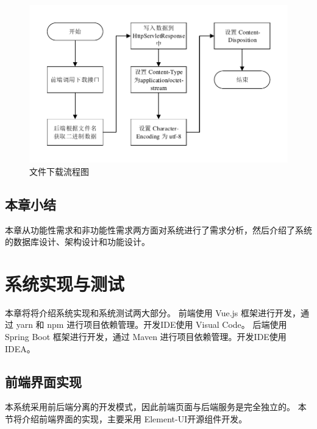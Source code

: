 \begin{figure}[ht]
    \centering
    \includegraphics[width=.8\linewidth]{./Figure/IMG_seq_download.pdf}
    \caption{文件下载流程图}\label{Fig:seq_download}
\end{figure}


\section{本章小结}
本章从功能性需求和非功能性需求两方面对系统进行了需求分析，然后介绍了系统的数据库设计、架构设计和功能设计。

\chapter{系统实现与测试}
本章将将介绍系统实现和系统测试两大部分。
前端使用 Vue.js 框架进行开发，通过 yarn 和 npm 进行项目依赖管理。开发IDE使用 Visual Code。 
后端使用 Spring Boot 框架进行开发，通过 Maven 进行项目依赖管理。开发IDE使用 IDEA。 

\section{前端界面实现}
本系统采用前后端分离的开发模式，因此前端页面与后端服务是完全独立的。
本节将介绍前端界面的实现，主要采用 Element-UI开源组件开发。

